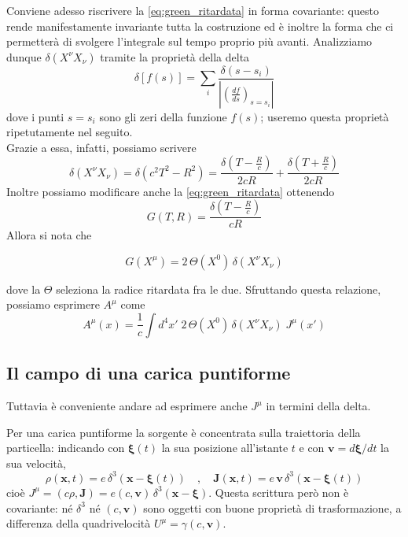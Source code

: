 Conviene adesso riscrivere la \eqref{eq:green_ritardata} in forma covariante: questo rende manifestamente invariante tutta la costruzione ed è inoltre la forma che ci permetterà di svolgere l'integrale sul tempo proprio più avanti. Analizziamo dunque $\delta(X^\nu X_{\nu})$ tramite la proprietà della delta
\begin{equation}
    \delta[f(s)] = \sum_i \frac{\delta(s - s_i)}{\left| \left(\frac{df}{ds}\right)_{s = s_i} \right|}
    \label{eq:proprieta_delta}
\end{equation}
dove i punti $s = s_i$ sono gli zeri della funzione $f(s)$; useremo questa proprietà ripetutamente nel seguito.\\
Grazie a essa, infatti, possiamo scrivere
\begin{equation}
    \delta(X^\nu X_\nu) = \delta(c^2 T^2 - R^2) = \frac{\delta\left( T - \frac{R}{c} \right)}{2cR} + \frac{\delta\left( T + \frac{R}{c} \right)}{2cR}
\end{equation}
Inoltre possiamo modificare anche la \eqref{eq:green_ritardata} ottenendo 
\begin{equation}
    G(T,R) = \frac{\delta\left(T-\frac{R}{c}\right)}{cR}
\end{equation}
Allora si nota che 
\begin{tcolorbox}[colback=black!5!white, colframe=black!45!white, boxrule=0.8pt]
\begin{equation}
    G(X^\mu) = 2\, \Theta(X^0)\,\delta(X^\nu X_\nu) 
    \label{eq:green_covariante}
\end{equation}
\end{tcolorbox}
dove la $\Theta$ seleziona la radice ritardata fra le due. Sfruttando questa relazione, possiamo esprimere $A^\mu$ come 
\begin{equation}
\label{eq:Quadripotenziale_funzioneJ}
    A^\mu(x) = \frac{1}{c}\int d^4x'\; 2\, \Theta(X^0)\,\delta(X^\nu X_\nu)\; J^\mu(x')  
\end{equation}

\subsection*{Il campo di una carica puntiforme}

Tuttavia è conveniente andare ad esprimere anche $J^\mu$ in termini della delta.

Per una carica puntiforme la sorgente è concentrata sulla traiettoria della particella: indicando con $\boldsymbol{\xi}(t)$ la sua posizione all'istante $t$ e con $\mathbf{v} = d\boldsymbol{\xi}/dt$ la sua velocità,
\begin{equation}
    \rho(\mathbf{x},t) = e\, \delta^3 \left(\mathbf{x}-\boldsymbol{\xi}(t)\right) \quad , \quad \mathbf{J}(\mathbf{x},t) = e\, \mathbf{v}\, \delta^3 \left(\mathbf{x}-\boldsymbol{\xi}(t)\right)
    \label{eq:rho_J_puntiforme}
\end{equation}
cioè $J^\mu = (c\rho,\mathbf{J}) = e (c,\mathbf{v})\,\delta^3(\mathbf{x}-\boldsymbol{\xi})$. Questa scrittura però non è covariante: né $\delta^3$ né $(c,\mathbf{v})$ sono oggetti con buone proprietà di trasformazione, a differenza della quadrivelocità $U^\mu = \gamma(c,\mathbf{v})$.

